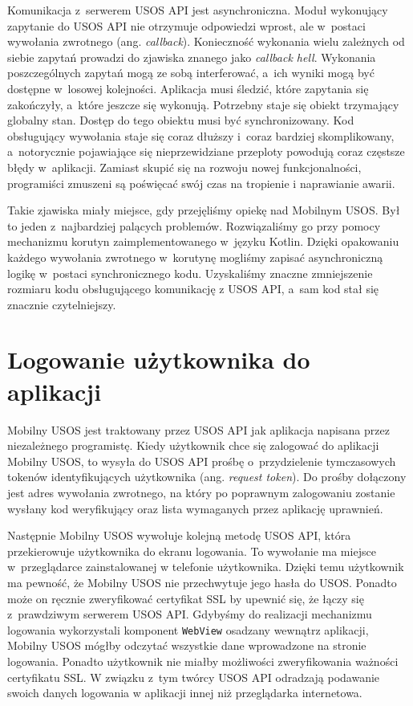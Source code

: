 \documentclass{pracamgr}
\begin{document}
Komunikacja z~serwerem USOS API jest asynchroniczna. Moduł wykonujący zapytanie
do USOS API nie otrzymuje odpowiedzi wprost, ale w~postaci wywołania zwrotnego
(ang. \textit{callback}). Konieczność wykonania wielu zależnych od siebie zapytań
prowadzi do zjawiska znanego jako \textit{callback hell}. Wykonania poszczególnych
zapytań mogą ze sobą interferować, a~ich wyniki mogą być dostępne w~losowej kolejności.
Aplikacja musi śledzić, które zapytania się zakończyły, a~które jeszcze się wykonują.
Potrzebny staje się obiekt trzymający globalny stan. Dostęp do tego obiektu musi
być synchronizowany. Kod obsługujący wywołania staje się coraz dłuższy i~coraz
bardziej skomplikowany, a~notorycznie pojawiające się nieprzewidziane przeploty
powodują coraz częstsze błędy w~aplikacji. Zamiast skupić się na rozwoju nowej
funkcjonalności, programiści zmuszeni są poświęcać swój czas na tropienie i
naprawianie awarii.

Takie zjawiska miały miejsce, gdy przejęliśmy opiekę nad Mobilnym USOS. Był to
jeden z~najbardziej palących problemów. Rozwiązaliśmy go przy pomocy mechanizmu
korutyn zaimplementowanego w~języku Kotlin. Dzięki opakowaniu każdego wywołania
zwrotnego w~korutynę mogliśmy zapisać asynchroniczną logikę w~postaci synchronicznego
kodu. Uzyskaliśmy znaczne zmniejszenie rozmiaru kodu obsługującego komunikację z
USOS API, a~sam kod stał się znacznie czytelniejszy.

\section{Logowanie użytkownika do aplikacji}

Mobilny USOS jest traktowany przez USOS API jak aplikacja napisana przez niezależnego
programistę. Kiedy użytkownik chce się zalogować do aplikacji Mobilny USOS, to wysyła
do USOS API prośbę o~przydzielenie tymczasowych tokenów identyfikujących użytkownika
(ang. \textit{request token}). Do prośby dołączony jest adres wywołania zwrotnego,
na który po poprawnym zalogowaniu zostanie wysłany kod weryfikujący oraz lista
wymaganych przez aplikację uprawnień.

Następnie Mobilny USOS wywołuje kolejną metodę USOS API, która przekierowuje
użytkownika do ekranu logowania. To wywołanie ma miejsce w~przeglądarce zainstalowanej
w telefonie użytkownika. Dzięki temu użytkownik ma pewność, że Mobilny USOS nie
przechwytuje jego hasła do USOS. Ponadto może on ręcznie zweryfikować certyfikat SSL
by upewnić się, że łączy się z~prawdziwym serwerem USOS API. Gdybyśmy do realizacji
mechanizmu logowania wykorzystali komponent \texttt{WebView} osadzany wewnątrz aplikacji,
Mobilny USOS mógłby odczytać wszystkie dane wprowadzone na stronie logowania.
Ponadto użytkownik nie miałby możliwości zweryfikowania ważności certyfikatu SSL.
W związku z~tym twórcy USOS API odradzają podawanie swoich danych logowania w
aplikacji innej niż przeglądarka internetowa.
\end{document}
